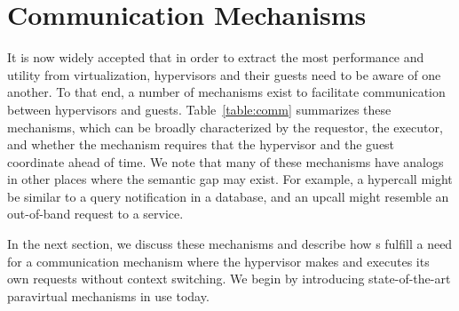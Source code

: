 \documentclass[11pt]{article}
\begin{document}

	
	




\section{Communication Mechanisms}
\label{sec:background}

It is now widely accepted that in order to extract the most 
performance and utility from virtualization, hypervisors 
and their guests need to be aware of one another.
To that end, a number of mechanisms exist to facilitate 
communication between hypervisors and guests. Table~\ref{table:comm} 
summarizes these mechanisms, which can be broadly characterized by
the requestor, the executor, 
and whether the mechanism requires that the hypervisor
and the guest coordinate ahead of time. We note that many of these
mechanisms have analogs in other places where the semantic gap may exist.
For example, a hypercall might be similar to a query notification in a database, and
an upcall might resemble an out-of-band request to a service. 

In the next section, we discuss these mechanisms 
and describe how \hypercallback{}s fulfill a need for a 
communication mechanism where the hypervisor makes and 
executes its own requests without context switching. 
We begin by introducing state-of-the-art paravirtual
mechanisms in use today. 
\end{document}
